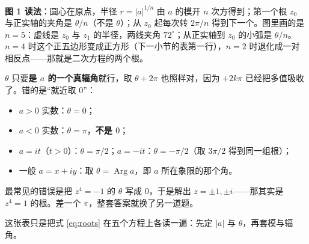 \documentclass[11pt]{ctexart}
\let\origsubhdr\subhdr
\renewcommand{\subhdr}[1]{\par\needspace{4\baselineskip}\origsubhdr{#1}}
\begin{document}
\begin{center}
\end{center}

\textbf{图 1 读法}：圆心在原点，半径 $r=|a|^{1/n}$ 由 $a$ 的模开 $n$ 次方得到；第一个根 $z_0$ 与正实轴的夹角是 $\theta/n$（不是 $\theta$）；从 $z_0$ 起每次转 $2\pi/n$ 得到下一个。图里画的是 $n=5$：虚线是 $z_0$ 与 $z_1$ 的半径，两线夹角 $72^\circ$；从正实轴到 $z_0$ 的小弧是 $\theta/n$。$n=4$ 时这个正五边形变成正方形（下一小节的表第一行），$n=2$ 时退化成一对相反点——那就是二次方程的两个根。


$\theta$ 只要\textbf{是 $a$ 的一个真辐角}就行，取 $\theta+2\pi$ 也照样对，因为 $+2k\pi$ 已经把多值吸收了。错的是“就近取 $0$”：

\begin{itemize}
\item $a>0$ 实数：$\theta=0$；
\item $a<0$ 实数：$\theta=\pi$，\textbf{不是 $0$}；
\item $a=it$（$t>0$）：$\theta=\pi/2$；$a=-it$：$\theta=-\pi/2$（取 $3\pi/2$ 得到同一组根）；
\item 一般 $a=x+iy$：取 $\theta=\operatorname{Arg}a$，即 $a$ 所在象限的那个角。
\end{itemize}

最常见的错误是把 $z^{4}=-1$ 的 $\theta$ 写成 $0$，于是解出 $z=\pm1,\pm i$——那其实是 $z^{4}=1$ 的根。差一个 $\pi$，整套答案就换了另一道题。


这张表只是把式 \eqref{eq:roots} 在五个方程上各读一遍：先定 $|a|$ 与 $\theta$，再套模与辐角。
\end{document}
